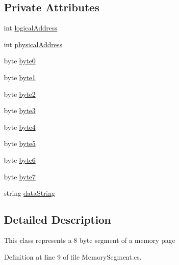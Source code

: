 \subsection*{Private Attributes}
\begin{DoxyCompactItemize}
\item 
int \hyperlink{class_c_p_u___o_s___simulator_1_1_memory_1_1_memory_segment_aded927c02e3614943ebebb3eb6597284}{logical\+Address}
\item 
int \hyperlink{class_c_p_u___o_s___simulator_1_1_memory_1_1_memory_segment_af6d25683cc2a80607238dda52b09d457}{physical\+Address}
\item 
byte \hyperlink{class_c_p_u___o_s___simulator_1_1_memory_1_1_memory_segment_a97b8721f717e2fd03673d9dd96882ef8}{byte0}
\item 
byte \hyperlink{class_c_p_u___o_s___simulator_1_1_memory_1_1_memory_segment_aa64e7a88f9cdf5dbb5b0c846cc570a77}{byte1}
\item 
byte \hyperlink{class_c_p_u___o_s___simulator_1_1_memory_1_1_memory_segment_a4f6ad3b2d132bfc1c4bd16d8fcca8d56}{byte2}
\item 
byte \hyperlink{class_c_p_u___o_s___simulator_1_1_memory_1_1_memory_segment_a48874b9f9dede6546e365d3bc1e28926}{byte3}
\item 
byte \hyperlink{class_c_p_u___o_s___simulator_1_1_memory_1_1_memory_segment_a1979475ad1134e07235880ccbd6b82f7}{byte4}
\item 
byte \hyperlink{class_c_p_u___o_s___simulator_1_1_memory_1_1_memory_segment_a6d35dbdcd3428e9a1869fda265341123}{byte5}
\item 
byte \hyperlink{class_c_p_u___o_s___simulator_1_1_memory_1_1_memory_segment_a242f25c3861a3c0d1d51484203ea8603}{byte6}
\item 
byte \hyperlink{class_c_p_u___o_s___simulator_1_1_memory_1_1_memory_segment_af4a4ab7c802e0a5b5f3684c0cfac5f80}{byte7}
\item 
string \hyperlink{class_c_p_u___o_s___simulator_1_1_memory_1_1_memory_segment_a624f2466fc6b73498e222f43f329adbb}{data\+String}
\end{DoxyCompactItemize}


\subsection{Detailed Description}
This class represents a 8 byte segment of a memory page 



Definition at line 9 of file Memory\+Segment.\+cs.



